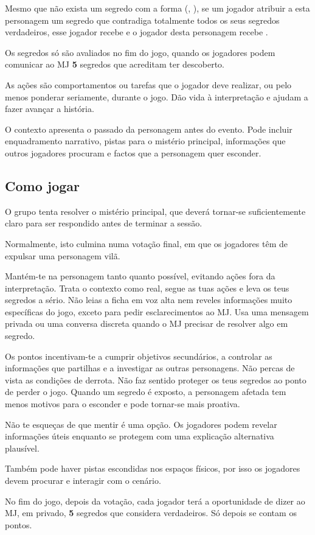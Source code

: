 Mesmo que não exista um segredo com a forma (, ), se um jogador atribuir a esta personagem um segredo que contradiga totalmente todos os seus segredos verdadeiros, esse jogador recebe  e o jogador desta personagem recebe .

Os segredos só são avaliados no fim do jogo, quando os jogadores podem comunicar ao MJ \textbf{5} segredos que acreditam ter descoberto.

As ações são comportamentos ou tarefas que o jogador deve realizar, ou pelo menos ponderar seriamente, durante o jogo. Dão vida à interpretação e ajudam a fazer avançar a história.

O contexto apresenta o passado da personagem antes do evento. Pode incluir enquadramento narrativo, pistas para o mistério principal, informações que outros jogadores procuram e factos que a personagem quer esconder.

\subsection{Como jogar}
O grupo tenta resolver o mistério principal, que deverá tornar-se suficientemente claro para ser respondido antes de terminar a sessão.

Normalmente, isto culmina numa votação final, em que os jogadores têm de expulsar uma personagem vilã.

Mantém-te na personagem tanto quanto possível, evitando ações fora da interpretação. Trata o contexto como real, segue as tuas ações e leva os teus segredos a sério. Não leias a ficha em voz alta nem reveles informações muito específicas do jogo, exceto para pedir esclarecimentos ao MJ. Usa uma mensagem privada ou uma conversa discreta quando o MJ precisar de resolver algo em segredo.

Os pontos incentivam-te a cumprir objetivos secundários, a controlar as informações que partilhas e a investigar as outras personagens. Não percas de vista as condições de derrota. Não faz sentido proteger os teus segredos ao ponto de perder o jogo. Quando um segredo é exposto, a personagem afetada tem menos motivos para o esconder e pode tornar-se mais proativa.

Não te esqueças de que mentir é uma opção. Os jogadores podem revelar informações úteis enquanto se protegem com uma explicação alternativa plausível.

Também pode haver pistas escondidas nos espaços físicos, por isso os jogadores devem procurar e interagir com o cenário.

No fim do jogo, depois da votação, cada jogador terá a oportunidade de dizer ao MJ, em privado, \textbf{5} segredos que considera verdadeiros. Só depois se contam os pontos.
